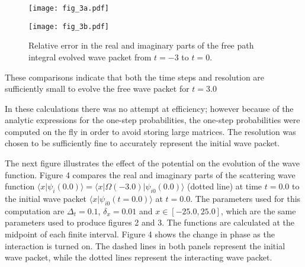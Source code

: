 \documentclass[aps,prc,reprint,noshowpacs,groupedaddress,onecolumn]{revtex4}
\begin{document}
\begin{figure}
\caption{Relative error in the real and imaginary parts of the free path
integral
evolved wave packet
from $t=-3$ to $t=0$.}
\begin{minipage}[t]{.45\linewidth}  
\centering
\texttt{[image: fig\_3a.pdf]}
\end{minipage}
\begin{minipage}[t]{.45\linewidth}  
\centering
\texttt{[image: fig\_3b.pdf]}
\end{minipage}
\label{figure 3}
\end{figure}  
These comparisons indicate that both the time steps and resolution are
sufficiently small to evolve the free wave packet for $t=3.0$

In these calculations there was no attempt at efficiency; however
because of the analytic expressions for the one-step
probabilities, the one-step probabilities were computed on the fly in
order to avoid storing large matrices.  The resolution was chosen
to be sufficiently fine to accurately represent the initial wave packet.

The next figure illustrates the effect of the potential on the
evolution of the wave function.  Figure 4 compares the real
and imaginary parts of
the scattering wave function
$\langle x \vert \psi_{i}(0.0)\rangle= \langle x \vert \Omega
(-3.0)\vert \psi_{i0}(0.0)\rangle$ (dotted line) at time $t=0.0$ to the
initial wave packet $\langle x \vert \psi_{i0} (t=0.0)\rangle$ at $t=0.0$.
The parameters used for this computation are $\Delta_t=0.1$,
$\delta_x=0.01$ and $x\in [-25.0,25.0]$, which are the same parameters used
to produce figures 2 and 3.  The functions are calculated at the
midpoint of each finite interval.  Figure 4
shows the change in phase as the interaction is turned on.  The dashed
lines in both panels represent the initial wave packet, while the
dotted lines represent the interacting wave packet.
\end{document}
